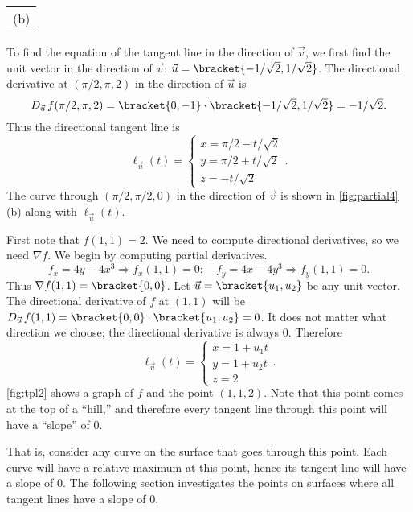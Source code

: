 {{\begin{tabular}{c}
(b)
\end{tabular}
}
To find the equation of the tangent line in the direction of $\vec v$, we first find the unit vector in the direction of $\vec v$: $\vec u =\bracket{-1/\sqrt{2},1/\sqrt{2}}$. The directional derivative at $(\pi/2,\pi,2)$ in the direction of $\vec u$ is 
$$D_{\vec u\,}f(\pi/2,\pi,2) =\bracket{0,-1}\cdot\bracket{-1/\sqrt{2},1/\sqrt 2}= -1/\sqrt 2.$$
Thus the directional tangent line is 
$$\ell_{\vec u}(t) = \left\{\begin{array}{l} x= \pi/2 -t/\sqrt{2}\\ y = \pi/2 + t/\sqrt{2} \\ z= -t/\sqrt{2}\end{array}\right. .$$
The curve through $(\pi/2,\pi/2,0)$ in the direction of $\vec v$ is shown in \autoref{fig:partial4}(b) along with $\ell_{\vec u}(t)$.}

{First note that $f(1,1) = 2$. We need to compute directional derivatives, so we need $\nabla f$. We begin by computing partial derivatives.
$$f_x = 4y-4x^3 \Rightarrow f_x(1,1) = 0;\quad f_y = 4x-4y^3\Rightarrow f_y(1,1) = 0.$$
Thus $\nabla f(1,1) =\bracket{0,0}$. Let $\vec u =\bracket{u_1,u_2}$ be any unit vector. The directional derivative of $f$ at $(1,1)$ will be $D_{\vec u\,}f(1,1) =\bracket{0,0}\cdot\bracket{u_1,u_2}= 0$. It does not matter what direction we choose; the directional derivative is always 0. Therefore
$$\ell_{\vec u}(t) = \left\{\begin{array}{l} x= 1 +u_1t\\ y = 1+ u_2 t\\ z= 2\end{array}\right..$$
\autoref{fig:tpl2} shows a graph of $f$ and the point $(1,1,2)$. Note that this point comes at the top of a ``hill,'' and therefore every tangent line through this point will have a ``slope'' of 0. 


That is, consider any curve on the surface that goes through this point. Each curve will have a relative maximum at this point, hence its tangent line will have a slope of 0. The following section investigates the points on surfaces where all tangent lines have a slope of 0.}

